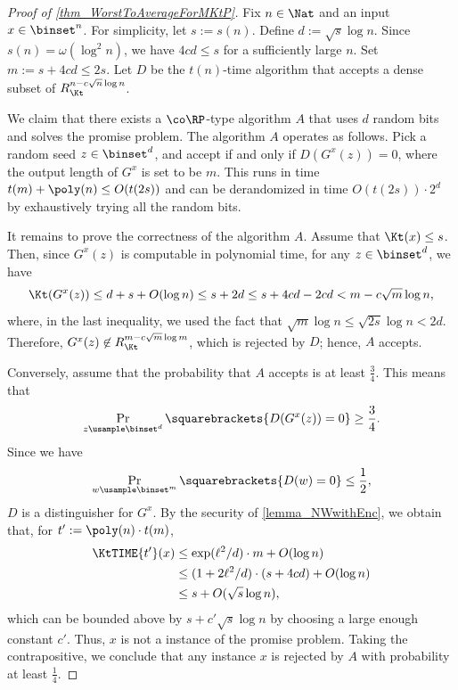 \documentclass{toc}
\begin{document}
\begin{proof}
  [Proof of \cref{thm_WorstToAverageForMKtP}]
  Fix $n \in \Nat$ and an input $x \in \binset^n$.
  For simplicity, let $s := s(n)$.
  Define $d := \sqrt{s} \log n$.  Since $s(n) = \omega(\log^2 n)$, we have $4 c d \le s$ for a sufficiently large $n$.
  Set $m := s + 4 c d \le 2 s$.
  Let $D$ be the $t(n)$-time algorithm that accepts a dense subset of $R_\Kt^{n - c \sqrt{n} \log n}$.

  We claim that there exists a $\co\RP$-type algorithm $A$ that
  uses $d$ random bits and
  solves the promise problem.
  The algorithm $A$ operates as follows.
  Pick a random seed $z \in \binset^d$, and accept if and only if $D(G^x(z)) = 0$,
  where the output length of $G^x$ is set to be $m$.
  This runs in time $t(m) + \poly(n) \le O(t(2 s))$ and can be derandomized in time $O(t(2 s)) \cdot 2^d$ by exhaustively trying all the random bits.

  It remains to prove the correctness of the algorithm $A$.
  Assume that $\Kt(x) \le s$.
  Then, since $G^x(z)$ is computable in polynomial time,
  for any $z \in \binset^d$, we have
  $$\Kt(G^x(z)) \le d + s + O(\log n) \le s + 2 d \le s + 4 c d - 2 c d < m - c \sqrt{m} \log n,$$
  where, in the last inequality, we used the fact that $\sqrt{m} \log n \le \sqrt{2 s} \log n < 2 d$.
  Therefore, $G^x(z) \not\in R_\Kt^{m - c \sqrt{m} \log m}$, which is rejected by $D$; hence, $A$ accepts.

  Conversely, assume that the probability that $A$ accepts is at least $\frac{3}{4}$.
  This means that $$\Pr_{z \usample \binset^d} \squarebrackets{ D(G^x(z)) = 0 } \ge \frac{3}{4}.$$
  Since we have $$\Pr_{w \usample \binset^m} \squarebrackets{ D(w) = 0 } \le \frac{1}{2},$$
  $D$ is a distinguisher for $G^x$.
  By the security of \cref{lemma_NWwithEnc},
  we obtain that, for $t' := \poly(n) \cdot t(m)$,
  \begin{align*}
    \KtTIME{t'}(x) & \le \exp(\ell^2 / d) \cdot m + O(\log n)
    \\ & \le (1 + 2 \ell^2 / d) \cdot (s + 4 c d) + O(\log n)
    \\ & \le s + O(\sqrt{s} \log n),
  \end{align*}
  which can be bounded above by $s + c' \sqrt{s} \log n$
  by choosing a large enough constant $c'$.
  Thus, $x$ is not a \No instance of the promise problem.
  Taking the contrapositive,
  we conclude that any \No instance $x$ is rejected by $A$ with probability at least $\frac{1}{4}$.
\end{proof}
\end{document}
